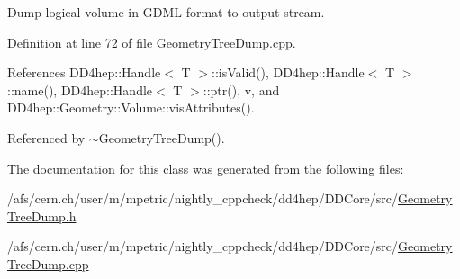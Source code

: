 Dump logical volume in G\+D\+ML format to output stream. 



Definition at line 72 of file Geometry\+Tree\+Dump.\+cpp.



References D\+D4hep\+::\+Handle$<$ T $>$\+::is\+Valid(), D\+D4hep\+::\+Handle$<$ T $>$\+::name(), D\+D4hep\+::\+Handle$<$ T $>$\+::ptr(), v, and D\+D4hep\+::\+Geometry\+::\+Volume\+::vis\+Attributes().



Referenced by $\sim$\+Geometry\+Tree\+Dump().



The documentation for this class was generated from the following files\+:\begin{DoxyCompactItemize}
\item 
/afs/cern.\+ch/user/m/mpetric/nightly\+\_\+cppcheck/dd4hep/\+D\+D\+Core/src/\hyperlink{_geometry_tree_dump_8h}{Geometry\+Tree\+Dump.\+h}\item 
/afs/cern.\+ch/user/m/mpetric/nightly\+\_\+cppcheck/dd4hep/\+D\+D\+Core/src/\hyperlink{_geometry_tree_dump_8cpp}{Geometry\+Tree\+Dump.\+cpp}\end{DoxyCompactItemize}
